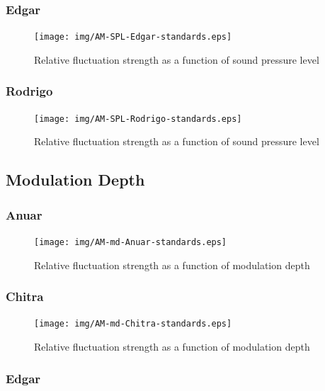 \documentclass[a4paper]{article}
\begin{document}
\subsubsection{Edgar}

\begin{figure}[H]
  \centering
  \texttt{[image: img/AM-SPL-Edgar-standards.eps]}
  \caption{Relative fluctuation strength as a function of sound pressure level}
\label{fig:SPL-edgar}
\end{figure}

\subsubsection{Rodrigo}

\begin{figure}[H]
  \centering
  \texttt{[image: img/AM-SPL-Rodrigo-standards.eps]}
  \caption{Relative fluctuation strength as a function of sound pressure level}
\label{fig:SPL-rodrigo}
\end{figure}

\subsection{Modulation Depth}

\subsubsection{Anuar}

\begin{figure}[H]
  \centering
  \texttt{[image: img/AM-md-Anuar-standards.eps]}
  \caption{Relative fluctuation strength as a function of modulation depth}
\label{fig:md-anuar}
\end{figure}

\subsubsection{Chitra}

\begin{figure}[H]
  \centering
  \texttt{[image: img/AM-md-Chitra-standards.eps]}
  \caption{Relative fluctuation strength as a function of modulation depth}
\label{fig:md-chitra}
\end{figure}

\subsubsection{Edgar}
\end{document}
